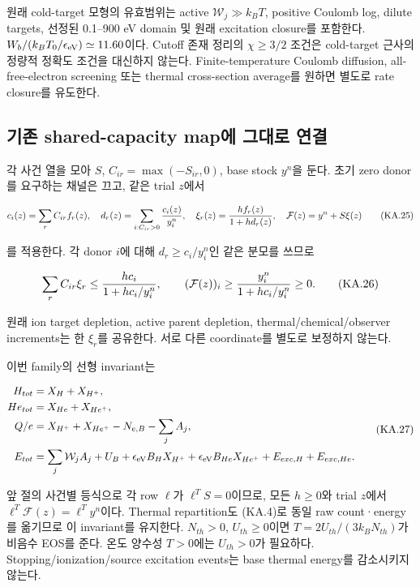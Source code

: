 \documentclass[11pt,a4paper]{article}
\begin{document}
원래 cold-target 모형의 유효범위는 active \(\mathcal W_j\gg k_BT\), positive Coulomb log, dilute targets, 선정된 0.1--900 eV domain 및 원래 excitation closure를 포함한다. \(W_b/(k_BT_0/\epsilon_{\rm eV})\simeq11.60\)이다. Cutoff 존재 정리의 \(\chi\ge3/2\) 조건은 cold-target 근사의 정량적 정확도 조건을 대신하지 않는다. Finite-temperature Coulomb diffusion, all-free-electron screening 또는 thermal cross-section average를 원하면 별도로 rate closure를 유도한다.

\hypertarget{uxae30uxc874-shared-capacity-mapuxc5d0-uxadf8uxb300uxb85c-uxc5f0uxacb0}{%
\subsection{기존 shared-capacity map에 그대로 연결}\label{uxae30uxc874-shared-capacity-mapuxc5d0-uxadf8uxb300uxb85c-uxc5f0uxacb0}}

각 사건 열을 모아 \(S\), \(C_{ir}=\max(-S_{ir},0)\), base stock \(y^n\)을 둔다. 초기 zero donor를 요구하는 채널은 끄고, 같은 trial \(z\)에서

\[
 c_i(z)=\sum_r C_{ir}f_r(z),\quad
 d_r(z)=\sum_{i:C_{ir}>0}{c_i(z)\over y_i^n},\quad
 \xi_r(z)={h f_r(z)\over1+h d_r(z)},\quad
 \mathcal F(z)=y^n+S\xi(z)
 \tag{KA.25}
\]

를 적용한다. 각 donor \(i\)에 대해 \(d_r\ge c_i/y_i^n\)인 같은 분모를 쓰므로

\[
 \sum_rC_{ir}\xi_r\le {h c_i\over1+h c_i/y_i^n},\qquad
 (\mathcal F(z))_i\ge{y_i^n\over1+h c_i/y_i^n}\ge0.
 \tag{KA.26}
\]

원래 ion target depletion, active parent depletion, thermal/chemical/observer increments는 한 \(\xi_r\)를 공유한다. 서로 다른 coordinate를 별도로 보정하지 않는다.

이번 family의 선형 invariant는

\[
 \begin{aligned}
 H_{tot}&=X_H+X_{H^+},\\
 He_{tot}&=X_{He}+X_{He^+},\\
 Q/e&=X_{H^+}+X_{He^+}-N_{e,B}-\sum_jA_j,\\
 E_{tot}&=\sum_j\mathcal W_jA_j+U_B+\epsilon_{\rm eV}B_HX_{H^+}
                     +\epsilon_{\rm eV}B_{He}X_{He^+}+E_{exc,H}+E_{exc,He}.
 \end{aligned}\tag{KA.27}
\]

앞 절의 사건별 등식으로 각 row \(\ell\)가 \(\ell^TS=0\)이므로, 모든 \(h\ge0\)와 trial \(z\)에서 \(\ell^T\mathcal F(z)=\ell^Ty^n\)이다. Thermal repartition도 (KA.4)로 동일 raw count·energy를 옮기므로 이 invariant를 유지한다. \(N_{th}>0\), \(U_{th}\ge0\)이면 \(T=2U_{th}/(3k_BN_{th})\)가 비음수 EOS를 준다. 온도 양수성 \(T>0\)에는 \(U_{th}>0\)가 필요하다. Stopping/ionization/source excitation events는 base thermal energy를 감소시키지 않는다.
\end{document}
